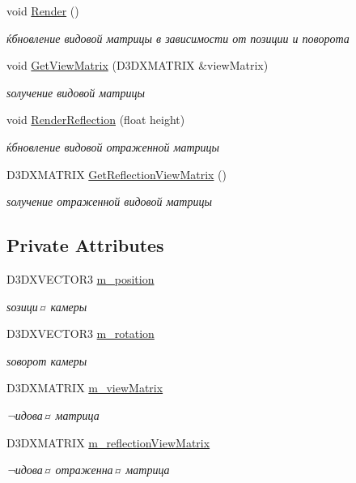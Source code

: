 \begin{DoxyCompactItemize}
void \hyperlink{class_camera_class_aa45890afd771cf300257d29b0868612f}{Render} ()
\begin{DoxyCompactList}\small\item\em ќбновление видовой матрицы в зависимости от позиции и поворота \end{DoxyCompactList}\item 
void \hyperlink{class_camera_class_a62f762b7c869ee03ac0236648cd0767c}{Get\+View\+Matrix} (D3\+D\+X\+M\+A\+T\+R\+IX \&view\+Matrix)
\begin{DoxyCompactList}\small\item\em ѕолучение видовой матрицы \end{DoxyCompactList}\item 
void \hyperlink{class_camera_class_a4207cefd6a1266aadd147095f164f805}{Render\+Reflection} (float height)
\begin{DoxyCompactList}\small\item\em ќбновление видовой отраженной матрицы \end{DoxyCompactList}\item 
D3\+D\+X\+M\+A\+T\+R\+IX \hyperlink{class_camera_class_ae59c9f97c5da37e40fb081e53c630dbe}{Get\+Reflection\+View\+Matrix} ()
\begin{DoxyCompactList}\small\item\em ѕолучение отраженной видовой матрицы \end{DoxyCompactList}\end{DoxyCompactItemize}
\subsection*{Private Attributes}
\begin{DoxyCompactItemize}
\item 
D3\+D\+X\+V\+E\+C\+T\+O\+R3 \hyperlink{class_camera_class_ab72eca107da81697f9171a918de22c66}{m\+\_\+position}
\begin{DoxyCompactList}\small\item\em ѕозици¤ камеры \end{DoxyCompactList}\item 
D3\+D\+X\+V\+E\+C\+T\+O\+R3 \hyperlink{class_camera_class_a2e9904935aa83c05d1974bc1fc5fd882}{m\+\_\+rotation}
\begin{DoxyCompactList}\small\item\em ѕоворот камеры \end{DoxyCompactList}\item 
D3\+D\+X\+M\+A\+T\+R\+IX \hyperlink{class_camera_class_a6b3258f072a57473bd4842a9d51677c8}{m\+\_\+view\+Matrix}
\begin{DoxyCompactList}\small\item\em ¬идова¤ матрица \end{DoxyCompactList}\item 
D3\+D\+X\+M\+A\+T\+R\+IX \hyperlink{class_camera_class_ad99ce76f2bb5f3ddeb668fd530d7e88c}{m\+\_\+reflection\+View\+Matrix}
\begin{DoxyCompactList}\small\item\em ¬идова¤ отраженна¤ матрица \end{DoxyCompactList}\end{DoxyCompactItemize}


